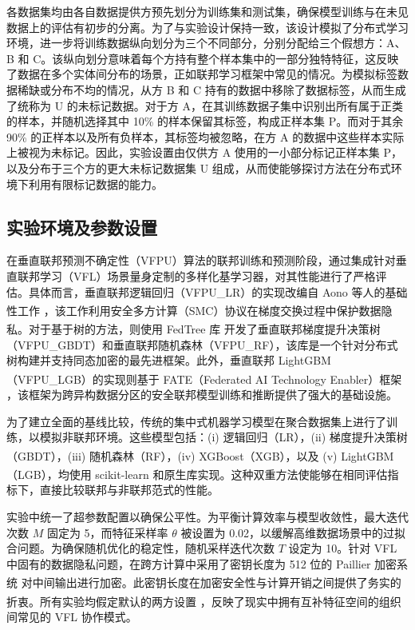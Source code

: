 各数据集均由各自数据提供方预先划分为训练集和测试集，确保模型训练与在未见数据上的评估有初步的分离。为了与实验设计保持一致，该设计模拟了分布式学习环境，进一步将训练数据纵向划分为三个不同部分，分别分配给三个假想方：A、B 和 C。该纵向划分意味着每个方持有整个样本集中的一部分独特特征，这反映了数据在多个实体间分布的场景，正如联邦学习框架中常见的情况。为模拟标签数据稀缺或分布不均的情况，从方 B 和 C 持有的数据中移除了数据标签，从而生成了统称为 U 的未标记数据。对于方 A，在其训练数据子集中识别出所有属于正类的样本，并随机选择其中 10\% 的样本保留其标签，构成正样本集 P。而对于其余 90\% 的正样本以及所有负样本，其标签均被忽略，在方 A 的数据中这些样本实际上被视为未标记。因此，实验设置由仅供方 A 使用的一小部分标记正样本集 P，以及分布于三个方的更大未标记数据集 U 组成，从而使能够探讨方法在分布式环境下利用有限标记数据的能力。
\subsection{实验环境及参数设置}
在垂直联邦预测不确定性（VFPU）算法的联邦训练和预测阶段，通过集成针对垂直联邦学习（VFL）场景量身定制的多样化基学习器，对其性能进行了严格评估。具体而言，垂直联邦逻辑回归（VFPU\_LR）的实现改编自 Aono 等人的基础性工作 \textsuperscript{\cite{aono2016scalable}}，该工作利用安全多方计算（SMC）协议在梯度交换过程中保护数据隐私。对于基于树的方法，则使用 FedTree 库 \textsuperscript{\cite{li2022fedtree}} 开发了垂直联邦梯度提升决策树（VFPU\_GBDT）和垂直联邦随机森林（VFPU\_RF），该库是一个针对分布式树构建并支持同态加密的最先进框架。此外，垂直联邦 LightGBM（VFPU\_LGB）的实现则基于 FATE（Federated AI Technology Enabler）框架 \textsuperscript{\cite{liu2021fate}}，该框架为跨异构数据分区的安全联邦模型训练和推断提供了强大的基础设施。  

为了建立全面的基线比较，传统的集中式机器学习模型在聚合数据集上进行了训练，以模拟非联邦环境。这些模型包括：(i) 逻辑回归（LR），(ii) 梯度提升决策树（GBDT），(iii) 随机森林（RF），(iv) XGBoost（XGB）\textsuperscript{\cite{chen2015xgboost}}，以及 (v) LightGBM（LGB）\textsuperscript{\cite{ke2017lightgbm}}，均使用 scikit-learn \textsuperscript{\cite{pedregosa2011scikit}} 和原生库实现。这种双重方法使能够在相同评估指标下，直接比较联邦与非联邦范式的性能。  

实验中统一了超参数配置以确保公平性。为平衡计算效率与模型收敛性，最大迭代次数 $ M $ 固定为 5，而特征采样率 $ \theta $ 被设置为 0.02，以缓解高维数据场景中的过拟合问题。为确保随机优化的稳定性，随机采样迭代次数 $ T $ 设定为 10。针对 VFL 中固有的数据隐私问题，在跨方计算中采用了密钥长度为 512 位的 Paillier 加密系统 \textsuperscript{\cite{paillier1999public}} 对中间输出进行加密。此密钥长度在加密安全性与计算开销之间提供了务实的折衷。所有实验均假定默认的两方设置 \textsuperscript{\cite{li2022fedtree}}，反映了现实中拥有互补特征空间的组织间常见的 VFL 协作模式。  

